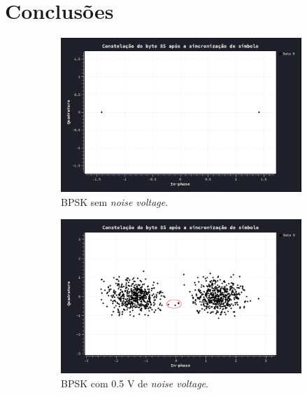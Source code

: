 \renewcommand{\thefigure}{C\arabic{figure}}
\renewcommand{\thetable}{C\arabic{table}}
\setcounter{figure}{0}
\section{Conclusões}
\label{sec:conclusao}
\begin{figure}[ht] 
    \begin{subfigure}[b]{0.5\linewidth}
        \centering
        \includegraphics[width=0.8\linewidth]{img/conclusao/const-byte85-bpsk.png}
        \caption{BPSK sem \textit{noise voltage}.} 
        \label{fig:a} 
        \vspace{1ex}
    \end{subfigure}%
    \begin{subfigure}[b]{0.5\linewidth}
        \centering
        \includegraphics[width=0.8\linewidth]{img/conclusao/const-byte85-bpsk-noisy.png} 
        \caption{BPSK com 0.5 V de \textit{noise voltage}.} 
        \label{fig:b} 
        \vspace{1ex}
    \end{subfigure} 
    \begin{subfigure}[b]{0.5\linewidth}

\end{subfigure}
\end{figure}
